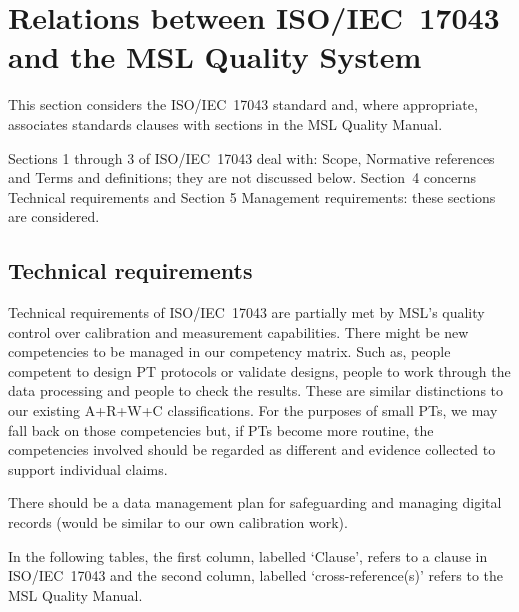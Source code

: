 \section{Relations between ISO/IEC~17043 and the MSL Quality System}
This section considers the ISO/IEC~17043 standard and, where appropriate, associates standards clauses with sections in the MSL Quality Manual. 

Sections 1 through 3 of ISO/IEC~17043 deal with: Scope, Normative references and Terms and definitions; they are not discussed below. Section~4 concerns Technical requirements and Section 5 Management requirements: these sections are considered.

\subsection{Technical requirements}

Technical requirements of ISO/IEC~17043 are partially met by MSL's quality control over calibration and measurement capabilities. There might be new competencies to be managed in our competency matrix. Such as, people competent to design PT protocols or validate designs, people to work through the data processing and people to check the results. These are similar distinctions to our existing A+R+W+C classifications. For the purposes of small PTs, we may fall back on those competencies but, if PTs become more routine, the competencies involved should be regarded as different and evidence collected to support individual claims.

There should be a data management plan for safeguarding and managing digital records (would be similar to our own calibration work).

In the following tables, the first column, labelled `Clause', refers to a clause in ISO/IEC~17043 and the second column, labelled `cross-reference(s)' refers to the MSL Quality Manual.

